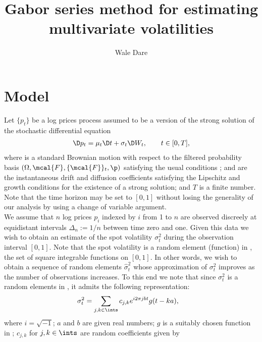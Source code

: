 
\usepackage[toc,page]{appendix}
\newcommand{\sv}{\ensuremath{\sigma_t^2}\xspace}
\newcommand{\svn}{\ensuremath{\hat{\sigma}_{t}^2}\xspace}
\newcommand{\svnN}{\ensuremath{\hat{\sigma}_{t}^2}\xspace}
\newcommand{\cjk}{\ensuremath{{c}_{j,k}}\xspace}
\newcommand{\cnjk}{\ensuremath{\hat{c}_{j,k}}\xspace}
\title{Gabor series method for estimating multivariate volatilities}
\author{Wale Dare}

\maketitle
\section{Model}
Let $\{p_t\}$ be a log prices process assumed to be a version of the strong solution of the stochastic differential  equation
\begin{align}
  \D p_t =   \mu_t \D t + \sigma_t \D W_t, \qquad t \in [0,T],
  \label{}
\end{align}
where \sbm is a standard Brownian motion with respect to the filtered probability basis $(\Omega, \mcal{F}, \{\mcal{F}\}_t, \p)$ satisfying the usual conditions ; \idp and \ivp are the instantaneous drift and diffusion coefficients satisfying the Lipschitz and growth conditions for the existence of a strong solution; and $T$ is a finite number. Note that the time horizon may be set to $[0,1]$  without losing the generality of our analysis by using a change of variable argument.   \\ 
\indent We assume that $n$ log prices $p_i$ indexed by $i$ from 1 to $n$ are observed discreely at equidistant intervals $\Delta_n := 1/n$ between time zero and one. Given this data we wish to obtain an estimate of the  spot volatility \sv during the observation interval $[0,1]$. Note that the spot volatility is a random element (function) in \ltwo, the set of square integrable functions on $[0,1]$. In other words,  we wish to obtain a sequence of random elements \svn whose approximation of \sv improves as the number of observations increases. To this end we note  that since \sv is a  random elements in \ltwo, it  admits the following representation:
\begin{align}
 & \sv = \sum_{j,k \in \ints} c_{j,k} e^{i2\pi j b t }g(t - k a) ,
  \label{}
\end{align}
where $i = \sqrt{-1}$; $a$ and $b$ are given real numbers; $g $ is a suitably chosen function in \ltwo; $c_{j,k}$ for $j,k \in \ints$ are random coefficients given by 
